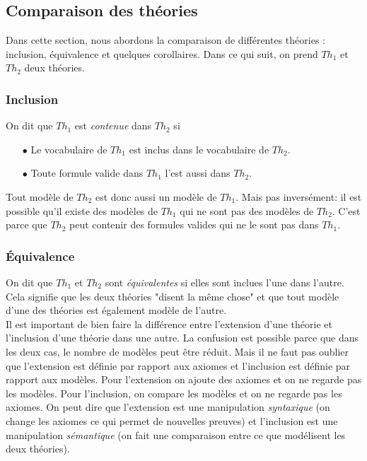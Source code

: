 {\subsection{Comparaison des théories}

Dans cette section, nous abordons la comparaison de différentes théories :
inclusion, équivalence et quelques corollaires.
Dans ce qui suit, on prend $Th_1$ et $Th_2$ deux théories.

\subsubsection{Inclusion}
On dit que $Th_1$ est {\em contenue} dans $Th_2$ si
\begin{itemize}
\item[$\bullet$] Le vocabulaire de $Th_1$ est inclus dans le vocabulaire de $Th_2$.
\item[$\bullet$] Toute formule valide dans $Th_1$ l'est aussi dans $Th_2$.
\end{itemize}
Tout modèle de $Th_2$ est donc aussi un modèle de $Th_1$.
Mais pas inversément: il est possible qu'il existe des modèles de $Th_1$ qui ne sont pas des modèles de $Th_2$.
C'est parce que $Th_2$ peut contenir des formules valides qui ne le sont pas dans $Th_1$.

\subsubsection{Équivalence}
On dit que $Th_1$ et $Th_2$ sont {\em équivalentes} si elles sont inclues l'une dans l'autre.
Cela signifie que les deux théories "disent la même chose" et que tout modèle d'une des théories est également modèle de l'autre.\\


Il est important de bien faire la différence entre
l'extension d'une théorie et l'inclusion d'une théorie dans une autre.
La confusion est possible parce que dans les deux cas, le nombre de modèles peut être réduit.
Mais il ne faut pas oublier que
l'extension est définie par rapport aux axiomes et l'inclusion est définie par rapport aux modèles.
Pour l'extension on ajoute des axiomes et on ne regarde pas les modèles.
Pour l'inclusion, on compare les modèles et on ne regarde pas les axiomes.
On peut dire que l'extension est une manipulation {\em syntaxique} (on change les axiomes ce qui permet de nouvelles preuves)
et l'inclusion est une manipulation {\em sémantique} (on fait une comparaison entre ce que modélisent les deux théories).

}
